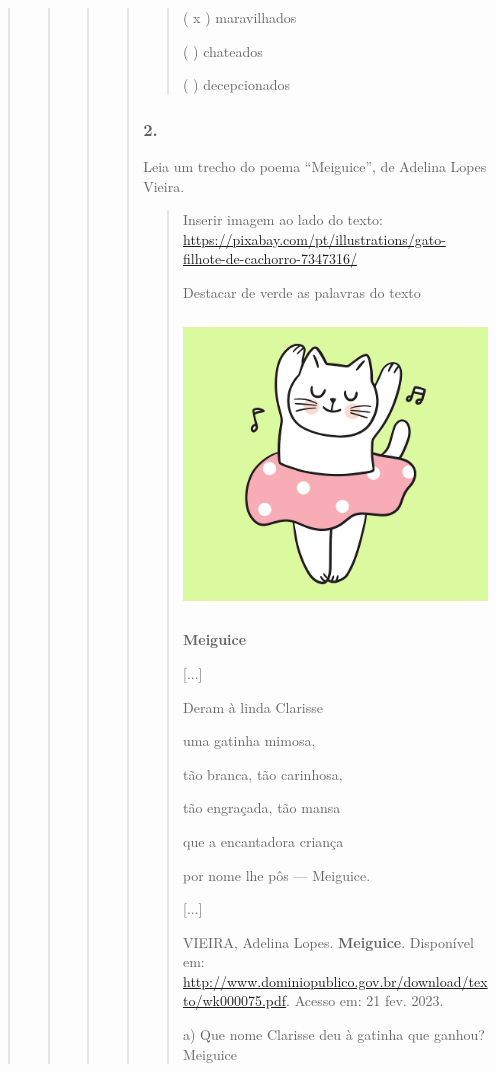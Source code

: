 \begin{quote}
\begin{quote}
\begin{quote}
\begin{quote}
\begin{quote}
( x ) maravilhados

( ) chateados

( ) decepcionados
\end{quote}

\subsubsection{2. }\label{section-58}

Leia um trecho do poema ``Meiguice'', de Adelina Lopes Vieira.

\begin{quote}
Inserir imagem ao lado do texto:
\url{https://pixabay.com/pt/illustrations/gato-filhote-de-cachorro-7347316/}

Destacar de verde as palavras do texto

\includegraphics[width=3.41667in,height=3.07500in]{media/image23.png}

\textbf{Meiguice}

{[}...{]}

Deram à linda Clarisse

uma gatinha mimosa,

tão branca, tão carinhosa,

tão engraçada, tão mansa

que a encantadora criança

por nome lhe pôs --- Meiguice.

{[}...{]}

VIEIRA, Adelina Lopes. \textbf{Meiguice}. Disponível em:
\url{http://www.dominiopublico.gov.br/download/texto/wk000075.pdf}.
Acesso em: 21 fev. 2023.

a) Que nome Clarisse deu à gatinha que ganhou? Meiguice


\end{quote}
\end{quote}
\end{quote}
\end{quote}
\end{quote}
